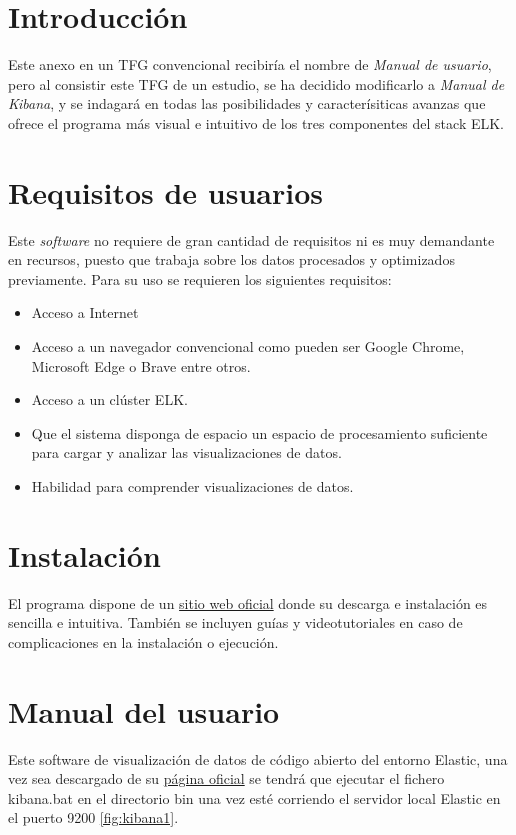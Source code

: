 
\section{Introducción}
Este anexo en un TFG convencional recibiría el nombre de \textit{Manual de usuario}, pero al consistir este TFG de un estudio, se ha decidido modificarlo a \textit{Manual de Kibana}, y se indagará en todas las posibilidades y caracterísiticas avanzas que ofrece el programa más visual e intuitivo de los tres componentes del stack ELK. 

\section{Requisitos de usuarios}
Este \textit{software} no requiere de gran cantidad de requisitos ni es muy demandante en recursos, puesto que trabaja sobre los datos procesados y optimizados previamente.
Para su uso se requieren los siguientes requisitos:
\begin{itemize}
    \item Acceso a Internet
    \item Acceso a un navegador convencional como pueden ser Google Chrome, Microsoft Edge o Brave entre otros.
    \item Acceso a un clúster ELK.
    \item Que el sistema disponga de espacio un espacio de procesamiento suficiente para cargar y analizar las visualizaciones de datos.
    \item Habilidad para comprender visualizaciones de datos.
\end{itemize}

\section{Instalación}
El programa dispone de un \href{https://www.elastic.co/es/kibana}{sitio web oficial} donde su descarga e instalación es sencilla e intuitiva. También se incluyen guías y videotutoriales en caso de complicaciones en la instalación o ejecución.

\section{Manual del usuario}

Este software de visualización de datos de código abierto del entorno Elastic, una vez sea descargado de su \href{https://www.elastic.co/es/kibana}{página oficial} se tendrá que ejecutar el fichero kibana.bat en el directorio bin una vez esté corriendo el servidor local Elastic en el puerto 9200 \ref{fig:kibana1}. 

